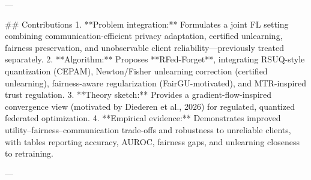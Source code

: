 ---

## Contributions  
1. **Problem integration:** Formulates a joint FL setting combining communication-efficient privacy adaptation, certified unlearning, fairness preservation, and unobservable client reliability—previously treated separately.  
2. **Algorithm:** Proposes **RFed-Forget**, integrating RSUQ-style quantization (CEPAM), Newton/Fisher unlearning correction (certified unlearning), fairness-aware regularization (FairGU-motivated), and MTR-inspired trust regulation.  
3. **Theory sketch:** Provides a gradient-flow-inspired convergence view (motivated by Diederen et al., 2026) for regulated, quantized federated optimization.  
4. **Empirical evidence:** Demonstrates improved utility–fairness–communication trade-offs and robustness to unreliable clients, with tables reporting accuracy, AUROC, fairness gaps, and unlearning closeness to retraining.

---